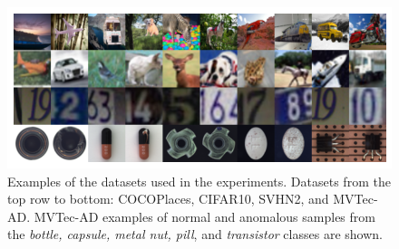 \begin{figure}
    \centering
    \includegraphics[width=\textwidth]{data/chapter_sgvaegan/fig5_all_grid.png}
    \caption{Examples of the datasets used in the experiments. Datasets from the top row to bottom: COCOPlaces, CIFAR10, SVHN2, and MVTec-AD. MVTec-AD examples of normal and anomalous samples from the \textit{bottle, capsule, metal nut, pill}, and \textit{transistor} classes are shown.}
    \label{fig:all_grid}
\end{figure}

